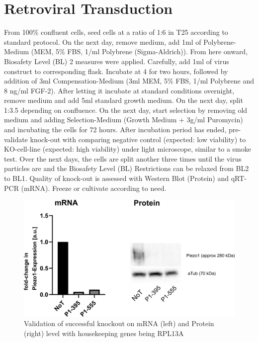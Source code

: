\section{Retroviral Transduction}
From 100\% confluent cells, seed cells at a ratio of 1:6 in T25 according to standard protocol. On the next day, remove medium, add 1ml of Polybrene-Medium (MEM\textalpha{}, 5\% FBS, 1\mul{}/ml Polybrene (Sigma-Aldrich)). From here onward, Biosafety Level (BL) 2 measures were applied. Carefully, add 1ml of virus construct to corresponding flask. Incubate at 4 \degC for two hours, followed by addition of 3ml Compensation-Medium (3ml MEM\textalpha{}, 5\% FBS, 1\mul{}/ml Polybrene and 8 ng/ml FGF-2). After letting it incubate at standard conditions overnight, remove medium and add 5ml standard growth medium. On the next day, split 1:3.5 depending on confluence. On the next day, start selection by removing old medium and adding Selection-Medium (Growth Medium + 3\textmu{}g/ml Puromycin) and incubating the cells for 72 hours. After incubation period has ended, pre-validate knock-out with comparing negative control (expected: low viability) to KO-cell-line (expected: high viability) under light microscope, similar to a smoke test. Over the next days, the cells are split another three times until the virus particles are  and the Biosafety Level (BL) Restrictions can be relaxed from BL2 to BL1. Quality of knock-out is assessed with Western Blot (Protein) and qRT-PCR (mRNA). Freeze or cultivate according to need. 

\begin{figure}
    \centering
    \includegraphics[width=\linewidth]{Piezo1KO_Verification_WBandPCR.png}
    \caption{Validation of successful knockout on mRNA (left) and Protein (right) level with housekeeping genes being RPL13A}
    \label{fig:KO-Verification}
\end{figure}


